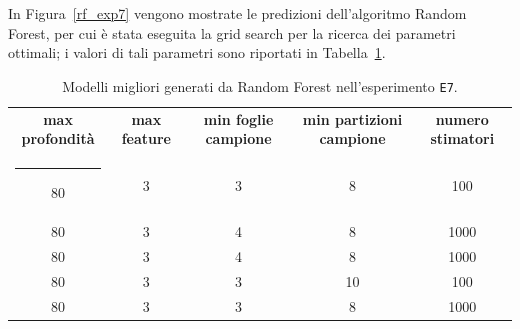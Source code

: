 \documentclass[12pt]{report}
\makeatletter
\theoremstyle{definition}
\newcommand{\thickhline}{%
    \noalign {\ifnum 0=`}\fi \hrule height 1pt
    \futurelet \reserved@a \@xhline
}
\makeatother
\begin{document}
In Figura~\ref{rf_exp7} vengono mostrate le predizioni dell'algoritmo Random Forest, per cui è stata eseguita la grid search per la ricerca dei parametri ottimali; i valori di tali parametri sono riportati in Tabella~\ref{models_rf_exp7}.

\begin{table}
\centering
\begin{adjustbox}{max width=\textwidth}
 \begin{tabular}{|c|c|c|c|c|} 
 \hline
\textbf{max profondità} & \textbf{max feature} & \textbf{min foglie campione} & \textbf{min partizioni campione} & \textbf{numero stimatori}
\\ [0.5ex] 
 \thickhline
 80 & 3 & 3 & 8 & 100 \\ 
 80 & 3 & 4 & 8 & 1000 \\ 
 80 & 3 & 4 & 8 & 1000 \\ 
 80 & 3 & 3 & 10 & 100 \\ 
 80 & 3 & 3 & 8 & 1000 \\ 
 \hline
\end{tabular}
\end{adjustbox}
\caption{Modelli migliori generati da Random Forest nell'esperimento \texttt{E7}.}
\label{models_rf_exp7}
\end{table}
\end{document}
